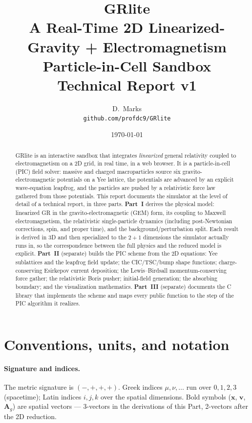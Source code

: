 \documentclass[11pt]{article}
\title{\textbf{GRlite}\\[2pt]
  \large A Real-Time 2D Linearized-Gravity + Electromagnetism\\
  Particle-in-Cell Sandbox\\[6pt]
  \normalsize Technical Report v1}
\author{D.\ Marks\\\small\texttt{github.com/profdc9/GRlite}}
\date{\today}
\newcommand{\Ag}{\mathbf{A}_g}             %
\newcommand{\vv}[1]{\mathbf{#1}}           %
\begin{document}
\maketitle

\begin{abstract}
GRlite is an interactive sandbox that integrates \emph{linearized} general
relativity coupled to electromagnetism on a 2D grid, in real time, in a web
browser.  It is a particle-in-cell (PIC) field solver: massive and charged
macroparticles source six gravito-electromagnetic potentials on a Yee lattice,
the potentials are advanced by an explicit wave-equation leapfrog, and the
particles are pushed by a relativistic force law gathered from those potentials.
This report documents the simulator at the level of detail of a technical
report, in three parts.  \textbf{Part~I} derives the physical model: linearized
GR in the gravito-electromagnetic (GEM) form, its coupling to Maxwell
electromagnetism, the relativistic single-particle dynamics (including
post-Newtonian corrections, spin, and proper time), and the
background/perturbation split.  Each result is derived in 3D and then
specialized to the $2{+}1$ dimensions the simulator actually runs in, so the
correspondence between the full physics and the reduced model is explicit.
\textbf{Part~II} (separate) builds the PIC scheme from the 2D equations: Yee
sublattices and the leapfrog field update; the CIC/TSC/bump shape functions;
charge-conserving Esirkepov current deposition; the Lewis--Birdsall
momentum-conserving force gather; the relativistic Boris pusher; initial-field
generation; the absorbing boundary; and the visualization mathematics.
\textbf{Part~III} (separate) documents the C library that implements the scheme
and maps every public function to the step of the PIC algorithm it realizes.
\end{abstract}

\tableofcontents

\section*{Conventions, units, and notation}

\paragraph{Signature and indices.}
The metric signature is $(-,+,+,+)$.  Greek indices $\mu,\nu,\dots$ run over
$0,1,2,3$ (spacetime); Latin indices $i,j,k$ over the spatial dimensions.  Bold
symbols ($\vv{x}$, $\vv{v}$, $\Ag$) are spatial vectors --- 3-vectors in the
derivations of this Part, 2-vectors after the 2D reduction.
\end{document}
